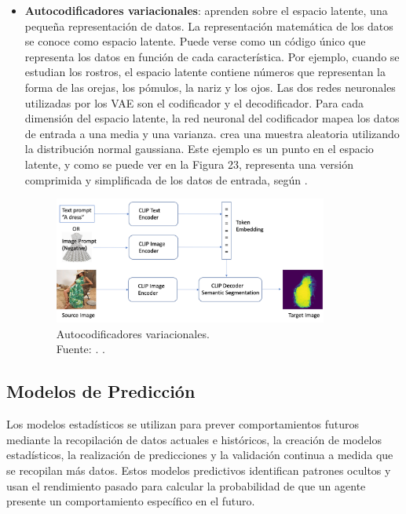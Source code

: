 \begin{itemize}
	\item \textbf{Autocodificadores variacionales}: aprenden sobre el espacio latente, una pequeña representación de datos. La representación matemática de los datos se conoce como espacio latente. Puede verse como un código único que representa los datos en función de cada característica. Por ejemplo, cuando se estudian los rostros, el espacio latente contiene números que representan la forma de las orejas, los pómulos, la nariz y los ojos. Las dos redes neuronales utilizadas por los VAE son el codificador y el decodificador. Para cada dimensión del espacio latente, la red neuronal del codificador mapea los datos de entrada a una media y una varianza. crea una muestra aleatoria utilizando la distribución normal gaussiana. Este ejemplo es un punto en el espacio latente, y como se puede ver en la Figura 23, representa una versión comprimida y simplificada de los datos de entrada, según \parencite{tec_amaz2023iagen}.
	
	\begin{figure}[!ht]
		\begin{center}
			\includegraphics[width=0.85\textwidth]{2/figures/autocodificadoresvariacionales.png}
			\caption[Autocodificadores variacionales]{Autocodificadores variacionales.\\
			Fuente: \cite{tec_amaz2023iagen}. .}
			\label{2:fig9}
		\end{center}
	\end{figure}
\end{itemize}


\subsection{Modelos de Predicción}

Los modelos estadísticos se utilizan para prever comportamientos futuros mediante la recopilación de datos actuales e históricos, la creación de modelos estadísticos, la realización de predicciones y la validación continua a medida que se recopilan más datos. Estos modelos predictivos identifican patrones ocultos y usan el rendimiento pasado para calcular la probabilidad de que un agente presente un comportamiento específico en el futuro. \parencite{gl_gartner2019pm}

